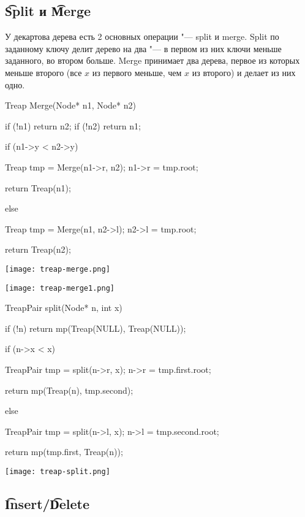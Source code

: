 \subsection{\t{Split} и \t{Merge}}

У декартова дерева есть 2 основных операции "--- split и merge.
Split по заданному ключу делит дерево на два "--- в первом из них ключи меньше заданного, во втором больше.
Merge принимает два дерева, первое из которых меньше второго (все $x$ из первого меньше, чем $x$ из второго) и делает из них одно.

\begin{cppcode}
Treap Merge(Node* n1, Node* n2) {
    if (!n1) {
        return n2;
    }
    if (!n2) {
        return n1;
    }

    if (n1->y < n2->y) {
        Treap tmp = Merge(n1->r, n2);
        n1->r = tmp.root;

        return Treap(n1);
    } else {
        Treap tmp = Merge(n1, n2->l);
        n2->l = tmp.root;

        return Treap(n2);
    }
}
\end{cppcode}

\begin{center} \texttt{[image: treap-merge.png]} \end{center}
\begin{center} \texttt{[image: treap-merge1.png]} \end{center}

\begin{cppcode}
TreapPair split(Node* n, int x) {
    if (!n) {
        return mp(Treap(NULL), Treap(NULL));
    }

    if (n->x < x) {
        TreapPair tmp = split(n->r, x);
        n->r = tmp.first.root;

        return mp(Treap(n), tmp.second);
    } else {
        TreapPair tmp = split(n->l, x);
        n->l = tmp.second.root;

        return mp(tmp.first, Treap(n));
    }
}
\end{cppcode}

\begin{center} \texttt{[image: treap-split.png]} \end{center}

\subsection{\t{Insert}/\t{Delete}}

